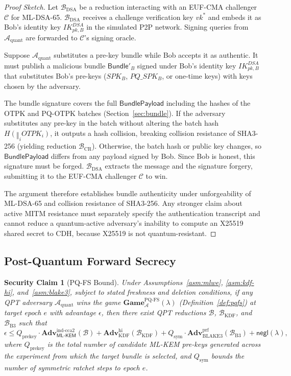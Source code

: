 \documentclass[11pt,a4paper]{article}
\newtheorem{securityclaim}[theorem]{Security Claim}
\theoremstyle{remark}
\theoremstyle{plain}
\newcommand{\negl}{\mathsf{negl}}
\newcommand{\Adv}{\mathbf{Adv}}
\newcommand{\PGame}{\mathbf{Game}}
\newcommand{\calA}{\mathcal{A}}
\newcommand{\calB}{\mathcal{B}}
\newcommand{\MLKEM}{\mathsf{ML\text{-}KEM}}
\newcommand{\bigcat}[2]{\displaystyle\mathop{\Vert}_{#1} #2}
\begin{document}
\begin{proof}[Proof Sketch]
Let $\calB_{\mathrm{DSA}}$ be a reduction interacting with an EUF-CMA challenger $\mathcal{C}$ for ML-DSA-65.
$\calB_{\mathrm{DSA}}$ receives a challenge verification key $vk^*$ and embeds it as Bob's identity key $IK^{DSA}_{pk,B}$ in the
simulated P2P network.  Signing queries from $\calA_{\mathrm{quant}}$ are forwarded to
$\mathcal{C}$'s signing oracle.

Suppose $\calA_{\mathrm{quant}}$ substitutes a pre-key bundle while Bob accepts it as
authentic.  It must publish a malicious bundle $\mathsf{Bundle}'_B$ signed under Bob's
identity key $IK^{DSA}_{pk,B}$ that substitutes Bob's pre-keys ($SPK_B$, $PQ\_SPK_B$, or
one-time keys) with keys chosen by the adversary.

The bundle signature covers the full $\mathsf{BundlePayload}$ including the hashes of the
OTPK and PQ-OTPK batches (Section~\ref{sec:bundle}).  If the adversary substitutes any pre-key in the batch without altering the batch hash $H(\bigcat{i} OTPK_i)$, it outputs a hash collision, breaking collision resistance of SHA3-256 (yielding reduction $\calB_{\mathrm{CR}}$). Otherwise, the batch hash or public key changes, so $\mathsf{BundlePayload}$ differs from any payload signed by Bob. Since Bob is honest, this signature must be forged.  $\calB_{\mathrm{DSA}}$ extracts the message and the signature forgery, submitting it to the EUF-CMA challenger $\mathcal{C}$ to win.

The argument therefore establishes bundle authenticity under unforgeability of ML-DSA-65 and collision resistance of SHA3-256.  Any stronger claim about
active MITM resistance must separately specify the authentication transcript and cannot
reduce a quantum-active adversary's inability to compute an X25519 shared secret to CDH,
because X25519 is not quantum-resistant.
\end{proof}

\subsection{Post-Quantum Forward Secrecy}

\begin{securityclaim}[PQ-FS Bound]
\label{thm:pqfs}
Under Assumptions~\ref{asm:mlwe}, \ref{asm:kdf-hi}, and~\ref{asm:blake3}, subject to stated freshness and deletion
conditions, if any QPT adversary $\calA_{\mathrm{quant}}$ wins the
game $\PGame^{\mathrm{PQ\text{-}FS}}_{\calA}(\lambda)$ (Definition~\ref{def:pqfs}) at target epoch $e$ with advantage $\epsilon$,
then there exist QPT reductions $\calB$, $\calB_{\mathrm{KDF}}$, and $\calB_{\mathrm{B3}}$ such that
\[
  \epsilon \leq Q_{\mathrm{prekey}} \cdot \Adv^{\mathrm{ind\text{-}cca2}}_{\MLKEM}(\calB)
             + \Adv^{\mathrm{hi}}_{\mathrm{KDF}}(\mathcal{B}_{\mathrm{KDF}})
             + Q_{\mathrm{sym}} \cdot \Adv^{\mathrm{prf}}_{\mathrm{BLAKE3}}(\mathcal{B}_{\mathrm{B3}})
             + \negl(\lambda),
\]
where $Q_{\mathrm{prekey}}$ is the total number of candidate ML-KEM pre-keys generated across the experiment from which the target bundle is selected, and $Q_{\mathrm{sym}}$ bounds the number of symmetric ratchet steps to epoch $e$.
\end{securityclaim}
\end{document}
